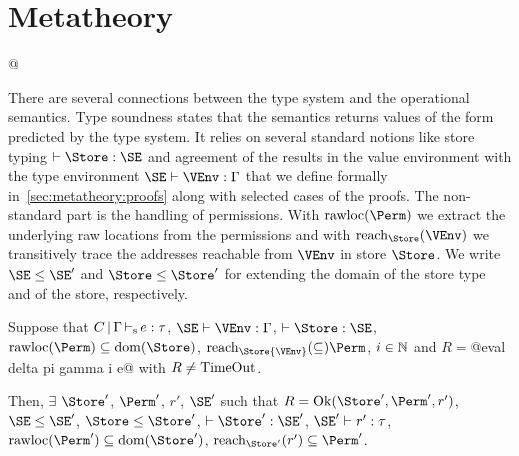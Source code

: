 \section{Metatheory}
\label{sec:metatheory}

\lstMakeShortInline[style=rule]@

There are several connections between the type system and
the operational semantics. Type soundness states
that the semantics returns values of the form predicted by the type
system. It relies on several standard notions like store typing
$\vdash \Store : \SE$ and agreement of the results in the value environment
with the type environment $\SE \vdash \VEnv:\E$ that we define
formally in~\cref{sec:metatheory:proofs} along with selected cases of the proofs. The
non-standard part is the handling of permissions. With
$\Rawloc\Perm$ we extract the underlying raw locations from the
permissions and with $\Reach\Store\VEnv$ we transitively trace the
addresses reachable from $\VEnv$ in store $\Store$. We write
$\SE\le\SE'$ and $\Store \le \Store'$ for extending the domain of the
store type and of the store, respectively.

\begin{theorem}\label{theorem:type-soundness}
  Suppose that
    $C \operatorname{|} \Gamma \operatorname{\vdash_s} e : \tau$,
    $\SE \vdash \VEnv : \E$,
    $\vdash \Store : \SE$,
    $\Rawloc\Perm \subseteq \Dom\Store$,
    $\Reach\Store{\VEnv} \subseteq \Perm$,
    $i\in\mathbb{N}$ and
    $R = $@eval delta pi gamma i e@
    with $R\ne \operatorname{TimeOut}$.

  Then,
  $\exists$ $\Store'$, $\Perm'$, $r'$, $\SE'$ such that
    $R = \Ok{\Store', \Perm', r'}$,
    $\SE \le \SE'$, $\Store \le \Store'$,
    $\vdash \Store' : \SE'$,
    $\SE' \vdash r' : \tau$,
    $\Rawloc{\Perm'} \subseteq \Dom{\Store'}$,
    $\Reach{\Store'}{r'} \subseteq \Perm'$.
\end{theorem}

